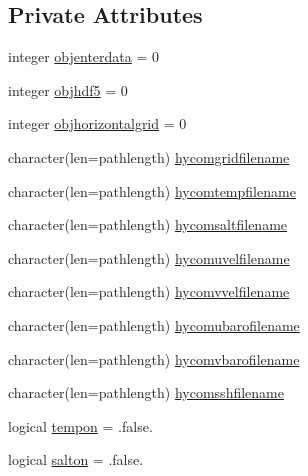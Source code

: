 \subsection*{Private Attributes}
\begin{DoxyCompactItemize}
\item 
integer \mbox{\hyperlink{structmodulehycomformat_1_1t__hycomformat_a64521906ae012e7b7282f610a06d0c7a}{objenterdata}} = 0
\item 
integer \mbox{\hyperlink{structmodulehycomformat_1_1t__hycomformat_aadae227cb7c3ba573929ac07467c29b4}{objhdf5}} = 0
\item 
integer \mbox{\hyperlink{structmodulehycomformat_1_1t__hycomformat_ae6e2a295f1db49c3a1215d2327abadf8}{objhorizontalgrid}} = 0
\item 
character(len=pathlength) \mbox{\hyperlink{structmodulehycomformat_1_1t__hycomformat_afe9780b3d810bc3008bfe19447e6c388}{hycomgridfilename}}
\item 
character(len=pathlength) \mbox{\hyperlink{structmodulehycomformat_1_1t__hycomformat_a77a09d605db02181bfc1e0dac1764774}{hycomtempfilename}}
\item 
character(len=pathlength) \mbox{\hyperlink{structmodulehycomformat_1_1t__hycomformat_a0596318b5f99a38e4c5efddd5b63299b}{hycomsaltfilename}}
\item 
character(len=pathlength) \mbox{\hyperlink{structmodulehycomformat_1_1t__hycomformat_a1fc238218b0897cf7c6136f962658d66}{hycomuvelfilename}}
\item 
character(len=pathlength) \mbox{\hyperlink{structmodulehycomformat_1_1t__hycomformat_ae46ccd0655536cea94cc27040d50c221}{hycomvvelfilename}}
\item 
character(len=pathlength) \mbox{\hyperlink{structmodulehycomformat_1_1t__hycomformat_a8f77a65ad5aeb64691e53cd264d48c40}{hycomubarofilename}}
\item 
character(len=pathlength) \mbox{\hyperlink{structmodulehycomformat_1_1t__hycomformat_a25042f46f31e941c89549e3779e482cb}{hycomvbarofilename}}
\item 
character(len=pathlength) \mbox{\hyperlink{structmodulehycomformat_1_1t__hycomformat_aab4d7962dd63e360b1c8a468f6732c18}{hycomsshfilename}}
\item 
logical \mbox{\hyperlink{structmodulehycomformat_1_1t__hycomformat_a2356dfdcacf78c61f9635ebe885a164a}{tempon}} = .false.
\item 
logical \mbox{\hyperlink{structmodulehycomformat_1_1t__hycomformat_aa68a8b30fedbe830d88778d4470e272b}{salton}} = .false.
\item 

\end{DoxyCompactItemize}
